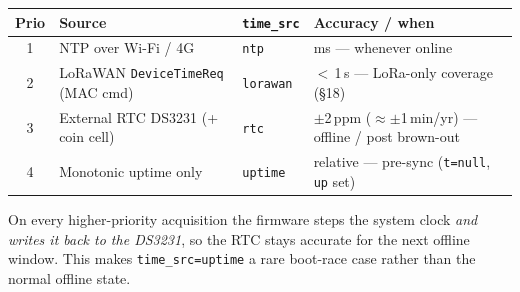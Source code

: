 \begin{center}
\renewcommand{\arraystretch}{1.2}\small
\begin{tabularx}{\textwidth}{@{}c l l X@{}}
\toprule
\textbf{Prio} & \textbf{Source} & \textbf{\texttt{time\_src}} & \textbf{Accuracy / when} \\
\midrule
1 & NTP over Wi-Fi / 4G & \texttt{ntp} & ms — whenever online \\
2 & LoRaWAN \texttt{DeviceTimeReq} (MAC cmd) & \texttt{lorawan} & $<$\,1\,s — LoRa-only coverage (\S18) \\
3 & External RTC DS3231 (+ coin cell) & \texttt{rtc} & $\pm$2\,ppm ($\approx\pm$1\,min/yr) — offline / post brown-out \\
4 & Monotonic uptime only & \texttt{uptime} & relative — pre-sync (\texttt{t=null}, \texttt{up} set) \\
\bottomrule
\end{tabularx}
\end{center}
\noindent On every higher-priority acquisition the firmware steps the system clock \emph{and writes
it back to the DS3231}, so the RTC stays accurate for the next offline window. This makes
\texttt{time\_src=uptime} a rare boot-race case rather than the normal offline state.

